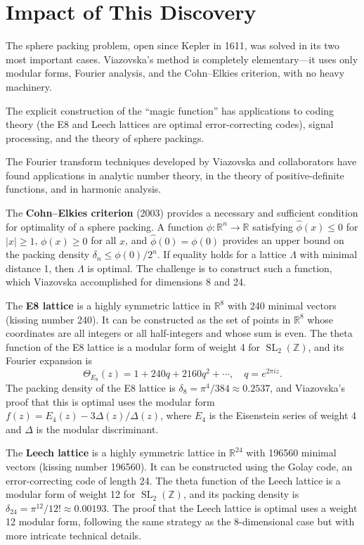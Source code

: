 \section{Impact of This Discovery}

The sphere packing problem, open since Kepler in 1611, was solved in its two most important cases. Viazovska's method is completely elementary---it uses only modular forms, Fourier analysis, and the Cohn--Elkies criterion, with no heavy machinery.

The explicit construction of the ``magic function'' has applications to coding theory (the E8 and Leech lattices are optimal error-correcting codes), signal processing, and the theory of sphere packings.

The Fourier transform techniques developed by Viazovska and collaborators have found applications in analytic number theory, in the theory of positive-definite functions, and in harmonic analysis.

The \textbf{Cohn--Elkies criterion} (2003) provides a necessary and sufficient condition for optimality of a sphere packing. A function $\phi: \mathbb{R}^n \to \mathbb{R}$ satisfying $\widehat{\phi}(x) \le 0$ for $|x| \ge 1$, $\phi(x) \ge 0$ for all $x$, and $\widehat{\phi}(0) = \phi(0)$ provides an upper bound on the packing density $\delta_n \le \phi(0)/2^n$. If equality holds for a lattice $\Lambda$ with minimal distance 1, then $\Lambda$ is optimal. The challenge is to construct such a function, which Viazovska accomplished for dimensions 8 and 24.

The \textbf{E8 lattice} is a highly symmetric lattice in $\mathbb{R}^8$ with 240 minimal vectors (kissing number 240). It can be constructed as the set of points in $\mathbb{R}^8$ whose coordinates are all integers or all half-integers and whose sum is even. The theta function of the E8 lattice is a modular form of weight 4 for $\operatorname{SL}_2(\mathbb{Z})$, and its Fourier expansion is
\[
\Theta_{E_8}(z) = 1 + 240q + 2160q^2 + \cdots, \quad q = e^{2\pi i z}.
\]
The packing density of the E8 lattice is $\delta_8 = \pi^4/384 \approx 0.2537$, and Viazovska's proof \cite{viazovska2016} that this is optimal uses the modular form $f(z) = E_4(z) - 3\Delta(z)/\Delta(z)$, where $E_4$ is the Eisenstein series of weight 4 and $\Delta$ is the modular discriminant.

The \textbf{Leech lattice} is a highly symmetric lattice in $\mathbb{R}^{24}$ with 196560 minimal vectors (kissing number 196560). It can be constructed using the Golay code, an error-correcting code of length 24. The theta function of the Leech lattice is a modular form of weight 12 for $\operatorname{SL}_2(\mathbb{Z})$, and its packing density is $\delta_{24} = \pi^{12}/12! \approx 0.00193$. The proof that the Leech lattice is optimal uses a weight 12 modular form, following the same strategy as the 8-dimensional case but with more intricate technical details.


